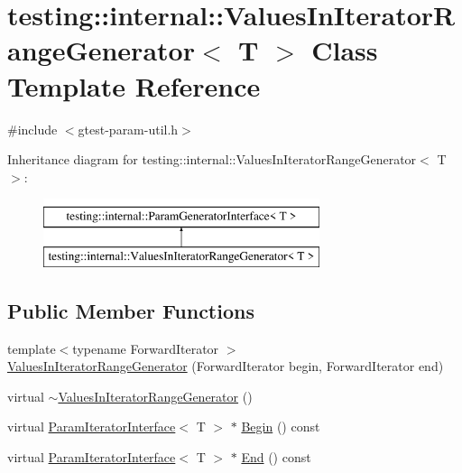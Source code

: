 \hypertarget{classtesting_1_1internal_1_1ValuesInIteratorRangeGenerator}{}\section{testing\+::internal\+::Values\+In\+Iterator\+Range\+Generator$<$ T $>$ Class Template Reference}
\label{classtesting_1_1internal_1_1ValuesInIteratorRangeGenerator}


{\ttfamily \#include $<$gtest-\/param-\/util.\+h$>$}

Inheritance diagram for testing\+::internal\+::Values\+In\+Iterator\+Range\+Generator$<$ T $>$\+:\begin{figure}[H]
\begin{center}
\leavevmode
\includegraphics[height=2.000000cm]{classtesting_1_1internal_1_1ValuesInIteratorRangeGenerator}
\end{center}
\end{figure}
\subsection*{Public Member Functions}
\begin{DoxyCompactItemize}
\item 
{\footnotesize template$<$typename Forward\+Iterator $>$ }\\\mbox{\hyperlink{classtesting_1_1internal_1_1ValuesInIteratorRangeGenerator_a8b30f6028bc5739bbd7c24b0f0e409f7}{Values\+In\+Iterator\+Range\+Generator}} (Forward\+Iterator begin, Forward\+Iterator end)
\item 
virtual \mbox{\hyperlink{classtesting_1_1internal_1_1ValuesInIteratorRangeGenerator_ab921d9574baa83a8d081f05aa2ebeaa4}{$\sim$\+Values\+In\+Iterator\+Range\+Generator}} ()
\item 
virtual \mbox{\hyperlink{classtesting_1_1internal_1_1ParamIteratorInterface}{Param\+Iterator\+Interface}}$<$ T $>$ $\ast$ \mbox{\hyperlink{classtesting_1_1internal_1_1ValuesInIteratorRangeGenerator_a91dac42f069cd06d05348fe5dd78639b}{Begin}} () const
\item 
virtual \mbox{\hyperlink{classtesting_1_1internal_1_1ParamIteratorInterface}{Param\+Iterator\+Interface}}$<$ T $>$ $\ast$ \mbox{\hyperlink{classtesting_1_1internal_1_1ValuesInIteratorRangeGenerator_a4af95b9eccfc86c40a715df2d9d0df40}{End}} () const
\end{DoxyCompactItemize}

